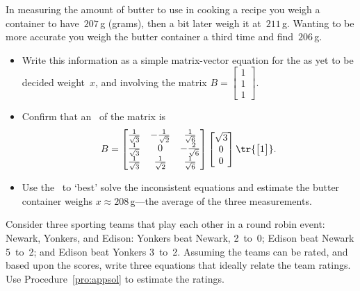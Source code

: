 \begin{exercise} \label{ex:} 
In measuring the amount of butter to use in cooking a recipe you weigh a container to have~\(207\)\,g (grams), then a bit later weigh it at~\(211\)\,g.  Wanting to be more accurate you weigh the butter container a third time and find~\(206\)\,g.
\begin{itemize}
\item Write this information as a simple matrix-vector equation for the as yet to be decided weight~\(x\), and involving the matrix \(B=\begin{bmatrix} 1\\1\\1 \end{bmatrix}\).
\item Confirm that an \svd\ of the matrix is
\begin{equation*}
B=\begin{bmatrix} \frac1{\sqrt3}&-\frac1{\sqrt2}&\frac1{\sqrt6}
\\\frac1{\sqrt3}&0&-\frac2{\sqrt6}
\\\frac1{\sqrt3}&\frac1{\sqrt2}&\frac1{\sqrt6}\end{bmatrix}
\begin{bmatrix} \sqrt3\\0\\0 \end{bmatrix}
\tr{\begin{bmatrix} 1 \end{bmatrix}}.
\end{equation*}
\item Use the \svd\ to `best' solve the inconsistent equations and estimate the butter container weighs \(x\approx 208\)\,g---the average of the three measurements.
\end{itemize}
\end{exercise}





\begin{exercise} \label{ex:} 
Consider three sporting teams that play each other in a round robin  event: Newark, Yonkers, and Edison:
Yonkers beat Newark, 2~to~0;
Edison beat Newark 5~to~2; and
Edison beat Yonkers 3~to~2.
Assuming the teams can be rated, and  based upon the scores, write three equations that ideally relate the team ratings.  
Use Procedure~\ref{pro:appsol} to estimate the ratings.
\end{exercise}



